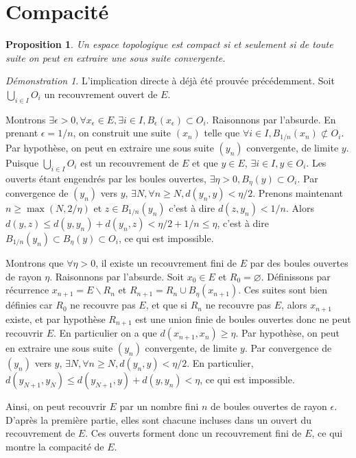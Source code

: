 \documentclass[a4paper, 11pt, french]{book}
\theoremstyle{plain} %
\newtheorem{proposition}{Proposition}
\theoremstyle{definition} %
\theoremstyle{remark} %
\newtheorem*{demonstration}{Démonstration}
\renewcommand{\setminus}{\backslash}
\newcommand{\1}{\mathds{1}}
\newcommand\vide{\varnothing}
\begin{document}
\section{Compacité}

\begin{proposition}
	Un espace topologique est compact si et seulement si de toute suite on peut en extraire une sous suite convergente.
\end{proposition}

\begin{demonstration}
	L'implication directe à déjà été prouvée précédemment.
	Soit $\bigcup_{i\in I}O_i$ un recouvrement ouvert de $E$.

	Montrons $\exists\epsilon>0, \forall x_\epsilon\in E, \exists i\in I, B_\epsilon(x_\epsilon)\subset O_i$.
	Raisonnons par l'absurde.
	En prenant $\epsilon=1/n$, on construit une suite $(x_n)$ telle que $\forall i\in I, B_{1/n}(x_n)\not\subset O_i$.
	Par hypothèse, on peut en extraire une sous suite $(y_n)$ convergente, de limite $y$.
	Puisque $\bigcup_{i\in I}O_i$ est un recouvrement de $E$ et que $y\in E$, $\exists i\in I, y\in O_i$.
	Les ouverts étant engendrés par les boules ouvertes, $\exists\eta>0, B_\eta(y)\subset O_i$.
	Par convergence de $(y_n)$ vers $y$, $\exists N, \forall n\geqslant N, d(y_n, y)<\eta/2$.
	Prenons maintenant $n\geqslant\max(N, 2/\eta)$ et $z\in B_{1/n}(y_n)$ c'est à dire $d(z, y_n)<1/n$.
	Alors $d(y, z)\leqslant d(y, y_n)+d(y_n, z)<\eta/2+1/n\leqslant\eta$, c'est à dire $B_{1/n}(y_n)\subset B_\eta(y)\subset O_i$, ce qui est impossible.

	Montrons que $\forall\eta>0$, il existe un recouvrement fini de $E$ par des boules ouvertes de rayon $\eta$.
	Raisonnons par l'absurde.
	Soit $x_0\in E$ et $R_0=\vide$.
	Définissons par récurrence $x_{n+1}=E\setminus R_n$ et $R_{n+1}=R_n\cup B_\eta(x_{n+1})$.
	Ces suites sont bien définies car $R_0$ ne recouvre pas $E$, et que si $R_n$ ne recouvre pas $E$, alors $x_{n+1}$ existe, et par hypothèse $R_{n+1}$ est une union finie de boules ouvertes donc ne peut recouvrir $E$.
	En particulier on a que $d(x_{n+1}, x_n)\geqslant\eta$.
	Par hypothèse, on peut en extraire une sous suite $(y_n)$ convergente, de limite $y$.
	Par convergence de $(y_n)$ vers $y$, $\exists N, \forall n\geqslant N, d(y_n, y)<\eta/2$.
	En particulier, $d(y_{N+1}, y_N)\leqslant d(y_{N+1}, y)+d(y, y_n)<\eta$, ce qui est impossible.

	Ainsi, on peut recouvrir $E$ par un nombre fini $n$ de boules ouvertes de rayon $\epsilon$.
	D'après la première partie, elles sont chacune incluses dans un ouvert du recouvrement de $E$.
	Ces ouverts forment donc un recouvrement fini de $E$, ce qui montre la compacité de $E$.
\end{demonstration}
\end{document}
